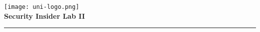 \begin{titlepage}
    \centering
    \begin{onehalfspace}
    	\begin{german}
        	\texttt{[image: uni-logo.png]}\\
        	\vspace{1.0cm}
        	\large {\bfseries Security Insider Lab II}\\ 

        	\vspace{2.5cm}

            \begin{doublespace}
            	\textenglish{\textsf{\Huge{\thetitle}}}
            \end{doublespace}

        	\vspace{2cm}

         

        	\vspace{1cm}

        	{\bfseries \large{\theauthor}}

        	\vfill

        			

        	\vspace{1.5cm}

        	\parbox{\linewidth}{\hrule\strut}

            \vfill

	    \textgerman{\thedate}
    	\end{german}
    \end{onehalfspace}
\end{titlepage}
